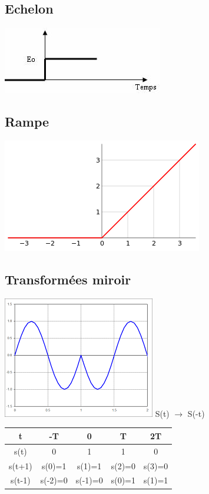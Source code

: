 \documentclass{article}
\begin{document}
\subsection{Echelon}
\begin{center}
	\includegraphics{img/echelon.jpg}
\end{center}
\subsection{Rampe}
\includegraphics{img/ramp.png}
\newline \newline
\subsection{Transform\'ees miroir}
\includegraphics{img/mirror.png}
\newline \newline
S(t) $ \rightarrow $ S(-t)

\begin{center}
	\begin{tabular}{ c || c | c | c | c }
		t & -T & 0 & T & 2T \\ \hline \hline
		s(t) & 0 & 1 & 1 & 0\\ \hline
		s(t+1) & s(0)=1 & s(1)=1 & s(2)=0 & s(3)=0\\ \hline
		s(t-1) & s(-2)=0 & s(-1)=0 & s(0)=1 & s(1)=1\\\hline
	\end{tabular}
\end{center}
\end{document}
